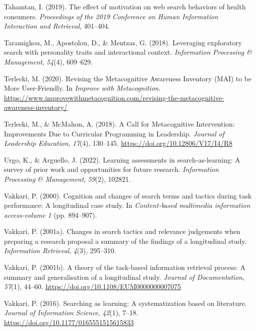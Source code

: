 \documentclass[letterpaper, nobind]{templates/ociamthesis}
\newlength{\cslhangindent}
\newenvironment{CSLReferences}[2] %
 {%
  \setlength{\parindent}{0pt}
  \ifodd #1
  \let\oldpar\par
  \def\par{\hangindent=\cslhangindent\oldpar}
  \fi
  \setlength{\parskip}{1mm}
  \setlength{\baselineskip}{6mm}
 }%
 {}
\begin{document}
\begin{CSLReferences}{1}{0}
\leavevmode{}%
Tahamtan, I. (2019). The effect of motivation on web search behaviors of health consumers. \emph{Proceedings of the 2019 Conference on Human Information Interaction and Retrieval}, 401--404.

\leavevmode{}%
Taramigkou, M., Apostolou, D., \& Mentzas, G. (2018). Leveraging exploratory search with personality traits and interactional context. \emph{Information Processing \& Management}, \emph{54}(4), 609--629.

\leavevmode{}%
Terlecki, M. (2020). Revising the {Metacognitive Awareness Inventory} ({MAI}) to be {More User}-{Friendly}. In \emph{Improve with Metacognition}. \url{https://www.improvewithmetacognition.com/revising-the-metacognitive-awareness-inventory/}

\leavevmode{}%
Terlecki, M., \& McMahon, A. (2018). A {Call} for {Metacognitive Intervention}: Improvements {Due} to {Curricular Programming} in {Leadership}. \emph{Journal of Leadership Education}, \emph{17}(4), 130--145. \url{https://doi.org/10.12806/V17/I4/R8}

\leavevmode{}%
Urgo, K., \& Arguello, J. (2022). Learning assessments in search-as-learning: A survey of prior work and opportunities for future research. \emph{Information Processing \& Management}, \emph{59}(2), 102821.

\leavevmode{}%
Vakkari, P. (2000). Cognition and changes of search terms and tactics during task performance: A longitudinal case study. In \emph{Content-based multimedia information access-volume 1} (pp. 894--907).

\leavevmode{}%
Vakkari, P. (2001a). Changes in search tactics and relevance judgements when preparing a research proposal a summary of the findings of a longitudinal study. \emph{Information Retrieval}, \emph{4}(3), 295--310.

\leavevmode{}%
Vakkari, P. (2001b). A theory of the task-based information retrieval process: A summary and generalisation of a longitudinal study. \emph{Journal of Documentation}, \emph{57}(1), 44--60. \url{https://doi.org/10.1108/EUM0000000007075}

\leavevmode{}%
Vakkari, P. (2016). Searching as learning: A systematization based on literature. \emph{Journal of Information Science}, \emph{42}(1), 7--18. \url{https://doi.org/10.1177/0165551515615833}


\end{CSLReferences}
\end{document}
